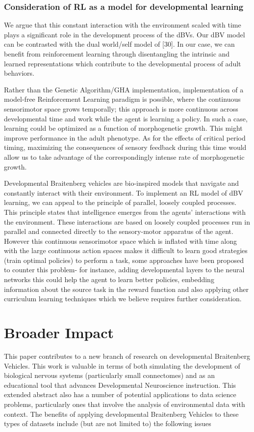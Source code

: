 \documentclass{article}
\begin{document}
\subsubsection*{Consideration of RL as a model for developmental learning}

We argue that this constant interaction with the environment scaled with time plays a significant role in the development process of the dBVs. Our dBV model can be contrasted with the dual world/self model of [30]. In our case, we can benefit from reinforcement learning through disentangling the intrinsic and learned representations which contribute to the developmental process of adult behaviors. 

Rather than the Genetic Algorithm/GHA implementation, implementation of a model-free Reinforcement Learning paradigm is possible, where the continuous sensorimotor space grows temporally; this approach is more continuous across developmental time and work while the agent is learning a policy. In such a case, learning could be optimized as a function of morphogenetic growth. This might improve performance in the adult phenotype. As for the effects of critical period timing, maximizing the consequences of sensory feedback during this time would allow us to take advantage of the correspondingly intense rate of morphogenetic growth.

Developmental Braitenberg vehicles are bio-inspired models that navigate and constantly interact with their environment. To implement an RL model of dBV learning, we can appeal to the principle of parallel, loosely coupled processes. This principle states that intelligence emerges from the agents' interactions with the environment. These interactions are based on loosely coupled processes run in parallel and connected directly to the sensory-motor apparatus of the agent. However this continuous sensorimotor space which is inflated with time along with the large continuous action spaces makes it difficult to learn good strategies (train optimal policies) to perform a task, some approaches have been proposed to counter this problem- for instance, adding developmental layers to the neural networks this could help the agent to learn better policies, embedding information about the source task in the reward function and also applying other curriculum learning techniques which we believe requires further consideration.

\section*{Broader Impact}
This paper contributes to a new branch of research on developmental Braitenberg Vehicles. This work is valuable in terms of both simulating the development of biological nervous systems (particularly small connectomes) and as an educational tool that advances Developmental Neuroscience instruction. This extended abstract also has a number of potential applications to data science problems, particularly ones that involve the analysis of environmental data with context. The benefits of applying developmental Braitenberg Vehicles to these types of datasets include (but are not limited to) the following issues
\end{document}

